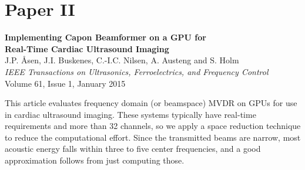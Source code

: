 % 



\section{Paper II}\label{sec:paperII} %
\textbf{Implementing Capon Beamformer on a GPU for\\ Real-Time Cardiac Ultrasound Imaging}\\
J.P. Åsen, J.I. Buskenes, C.-I.C. Nilsen, A. Austeng and S. Holm\\
\textit{IEEE Transactions on Ultrasonics, Ferroelectrics, and Frequency Control}\\
Volume 61, Issue 1, January 2015

This article evaluates frequency domain (or beamspace) MVDR on GPUs for use in cardiac ultrasound imaging. These systems typically have real-time requirements and more than 32 channels, so we apply a space reduction technique to reduce the computational effort. Since the transmitted beams are narrow, most acoustic energy falls within three to five center frequencies, and a good approximation follows from just computing those.

